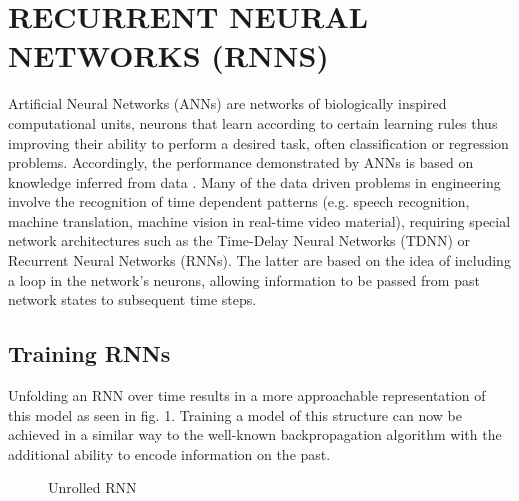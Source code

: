 \documentclass[letterpaper, 10 pt, conference]{ieeeconf}  %
\begin{document}
\section{RECURRENT NEURAL NETWORKS (RNNS)}
Artificial Neural Networks (ANNs) are networks of biologically inspired computational units, neurons that learn 
according to certain learning rules thus improving their ability to perform a desired task, often classification or regression 
problems. Accordingly, the performance demonstrated by ANNs is based on knowledge inferred from data \cite{schusterBidirectionalRecurrentNeural1997}.
Many of the data driven problems in engineering involve the recognition of time dependent patterns (e.g. speech
recognition, machine translation, machine vision in real-time video material), requiring special
network architectures such as the Time-Delay Neural Networks (TDNN) \cite{waibelPhonemeRecognitionUsing1989} or Recurrent Neural Networks (RNNs). 
The latter are based on the idea of including a loop in the network's neurons, allowing information to be passed 
from past network states to subsequent time steps. 

\subsection{Training RNNs}
Unfolding an RNN over time results in a more approachable representation of this model as seen in fig. 1. Training a 
model of this structure can now be achieved in a similar way to the well-known backpropagation algorithm with the additional 
ability to encode information on the past\cite{werbosBackpropagationTimeWhat1990}. 
\begin{figure}[thpb]
        \centering
  \caption{Unrolled RNN \cite{UnderstandingLSTMNetworks}}
        \label{figurelabel}
     \end{figure}
\end{document}
